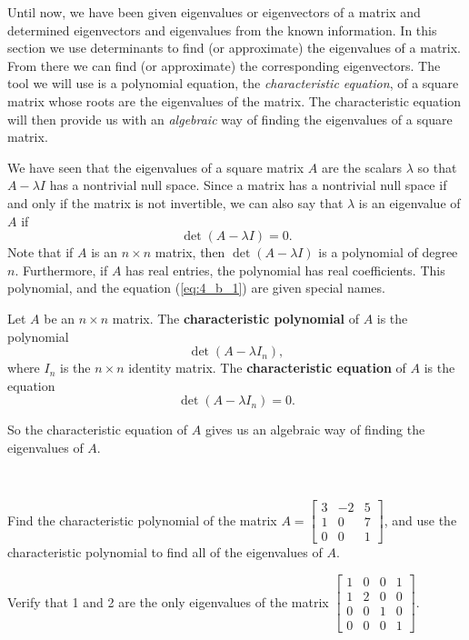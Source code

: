 \label{sec:chareq}

Until now, we have been given eigenvalues or eigenvectors of a matrix and determined eigenvectors and eigenvalues from the known information. In this section we use determinants to find (or approximate) the eigenvalues of a matrix. From there we can find (or approximate) the corresponding eigenvectors. The tool we will use is a polynomial equation, the \emph{characteristic equation}, of a square matrix whose roots are the eigenvalues of the matrix. The characteristic equation will then provide us with an \emph{algebraic} way of finding the eigenvalues of a square matrix. 

We have seen that the eigenvalues of a square matrix $A$ are the scalars $\lambda$ so that $A - \lambda I$ has a nontrivial null space. Since a matrix has a nontrivial null space if and only if the matrix is not invertible, we can also say that $\lambda$ is an eigenvalue of $A$ if
\begin{equation}
\det(A - \lambda I) = 0. \label{eq:4_b_1}
\end{equation}
Note that if $A$ is an $n \times n$ matrix, then $\det(A - \lambda I)$ is a polynomial of degree $n$. Furthermore, if $A$ has real entries, the polynomial has real coefficients. This polynomial, and the equation (\ref{eq:4_b_1}) are given special names.



\begin{definition} Let $A$ be an $n \times n$ matrix. The \textbf{characteristic polynomial} of $A$ is the polynomial
\[\det(A-\lambda I_n),\]
where $I_n$ is the $n \times n$ identity matrix. The \textbf{characteristic equation} of $A$ is the equation
\[\det(A-\lambda I_n) = 0.\]
\end{definition}



So the characteristic equation of $A$ gives us an algebraic way of finding the eigenvalues of $A$.



\begin{activity} \label{act:4_b_1} ~
	\ba
	\item Find the characteristic polynomial of the matrix $A = \left[ \begin{array}{crc} 3&-2&5 \\ 1&0&7 \\ 0&0&1 \end{array} \right]$, and use the characteristic polynomial to find all of the eigenvalues of $A$.
	

	
	\item  Verify that 1 and 2 are the only eigenvalues of the matrix $\left[ \begin{array}{cccc} 1&0&0&1\\ 1&2&0&0 \\ 0&0&1&0 \\ 0&0&0&1 \end{array} \right]$.



	\ea
\end{activity}



